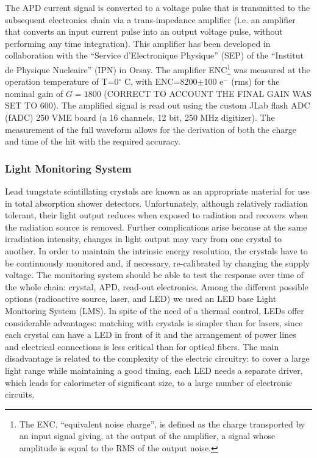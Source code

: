 
The APD current signal is converted to a
voltage pulse that is transmitted to the subsequent
electronics chain via a trans-impedance
amplifier (i.e. an amplifier that converts an
input current pulse into an output voltage
pulse, without performing any time integration).
This amplifier has been developed in
collaboration with the “Service d’Electronique
Physique” (SEP) of the “Institut de Physique
Nucleaire” (IPN) in Orsay. The amplifier ENC\footnote{The ENC, “equivalent noise charge”, is defined as the
charge transported by an input signal giving, at the
output of the amplifier, a signal whose amplitude is equal
to the RMS of the output noise.} was measured at the operation temperature of T=0$^\circ$ C,  with ENC=8200$\pm$100 e$^-$ (rms) for the nominal gain of $G=1800$ {\color{red} (CORRECT TO ACCOUNT THE FINAL GAIN WAS SET TO 600)}. 
The amplified signal is read out using the custom JLab flash ADC (fADC)  250 VME board (a 16 channels, 12 bit, 250 MHz digitizer). The measurement of the full waveform allows for the derivation of both the charge and time of the hit with the required   accuracy.

\subsubsection{Light Monitoring System}
Lead tungstate scintillating crystals are known
as an appropriate material for use in total absorption
shower detectors. Unfortunately, although
relatively radiation tolerant, their light output reduces when exposed to radiation
and recovers when the radiation source is
removed. Further complications
arise because at the same irradiation intensity, changes in light output may vary from
one crystal to another.
In order to maintain the intrinsic energy resolution, the crystals
have to be continuously monitored and,
if necessary, re-calibrated by changing the supply voltage.
The monitoring system should be able to 
 test the response over time of the whole chain: crystal,
APD, read-out electronics.
Among the different possible options (radioactive source, laser, and LED) we used an LED base Light Monitoring System (LMS). In spite of the
need of a thermal control, LEDs offer
considerable advantages: matching with
crystals is simpler than for lasers,
since each crystal can have a LED in
front of it and the arrangement of power
lines and electrical connections is less critical than for optical fibers.
The main disadvantage is related to the
complexity of the electric circuitry: to
cover a large light range while maintaining a good
timing, each LED needs a separate driver,
which leads for calorimeter of significant size,
to a large number of electronic circuits.

